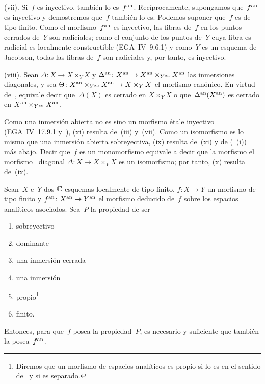(vii). Si~$f$ es inyectivo, también lo es~$f^{\mathrm{an}}$. Recíprocamente,
supongamos que~$f^{\mathrm{an}}$ es inyectivo y demostremos que~$f$ también lo es.
Podemos suponer
que~$f$ es de tipo finito. Como el morfismo~$f^{\mathrm{an}}$ es inyectivo, las fibras
de~$f$ en los puntos cerrados de~$Y$ son radiciales; como el conjunto de los
puntos de~$Y$ cuya fibra es radicial es localmente constructible
(EGA~IV~9.6.1) y como~$Y$ es un esquema de Jacobson, todas las fibras de~$f$
son radiciales y, por tanto, es inyectivo.

(viii). Sean $\Delta\colon X\to X\times_YX$ y
$\Delta^{\mathrm{an}}\colon X^{\mathrm{an}}\to X^{\mathrm{an}}\times_{Y^{\mathrm{an}}}X^{\mathrm{an}}$ las inmersiones
diagonales, y sea
$\Theta\colon X^{\mathrm{an}}\times_{Y^{\mathrm{an}}}X^{\mathrm{an}}\to X\times_YX$ el morfismo canónico.
En virtud de~, equivale decir que~$\Delta(X)$ es cerrado en
$X\times_YX$ o que~$\Delta^{\mathrm{an}}(X^{\mathrm{an}})$ es cerrado en
$X^{\mathrm{an}}\times_{Y^{\mathrm{an}}}X^{\mathrm{an}}$.

Como una inmersión abierta no es sino un morfismo étale inyectivo
(EGA~IV~17.9.1 y~\cite[ \S 1]{XII.4}), (xi) resulta de~(iii) y~(vii).
Como un isomorfismo es lo mismo que una inmersión abierta sobreyectiva, (ix)
resulta de~(xi) y de (~(i)) más abajo. Decir que~$f$ es un
monomorfismo equivale a decir que
{la morfismo}
{el morfismo}%
~diagonal $\Delta\colon X\to X\times_YX$ es un isomorfismo; por tanto, (x)
resulta de~(ix).

\begin{proposition}
\label{XII.3.2}
Sean~$X$ e~$Y$ dos $\mathbb C$-esquemas localmente de tipo finito,
$f\colon X\to Y$ un morfismo de tipo finito y
$f^{\mathrm{an}}\colon X^{\mathrm{an}}\to Y^{\mathrm{an}}$ el morfismo deducido de~$f$ sobre los espacios
analíticos asociados. Sea~$P$ la propiedad de ser
\begin{enumerate}
\item[(i)] sobreyectivo
\item[(ii)] dominante
\item[(iii)] una inmersión cerrada
\item[(iv)] una inmersión
\item[(v)] propio\footnote{Diremos que un morfismo de espacios analíticos es
propio si lo es en el sentido de~\cite[ch \S 10 ]{XII.1} y si es
separado.}
\item[(vi)]
finito.
\end{enumerate}
Entonces, para que~$f$ posea la propiedad~$P$, es necesario y suficiente que
también la posea~$f^{\mathrm{an}}$.
\end{proposition}

